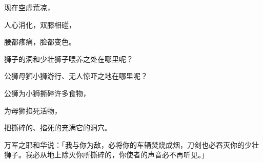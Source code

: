 {\par }{\BB \par }{\Q {}现在空虚荒凉，
\par }{\Q 人心消化，双膝相碰，
\par }{\Q 腰都疼痛，脸都变色。
\par }{\Q {}狮子的洞和少壮狮子喂养之处在哪里呢？
\par }{\Q 公狮母狮小狮游行、无人惊吓之地在哪里呢？
\par }{\Q {}公狮为小狮撕碎许多食物，
\par }{\Q 为母狮掐死活物，
\par }{\Q 把撕碎的、掐死的充满它的洞穴。
\par }{\PP {}万军之耶和华说：「我与你为敌，必将你的车辆焚烧成烟，刀剑也必吞灭你的少壮狮子。我必从地上除灭你所撕碎的，你使者的声音必不再听见。」

}
